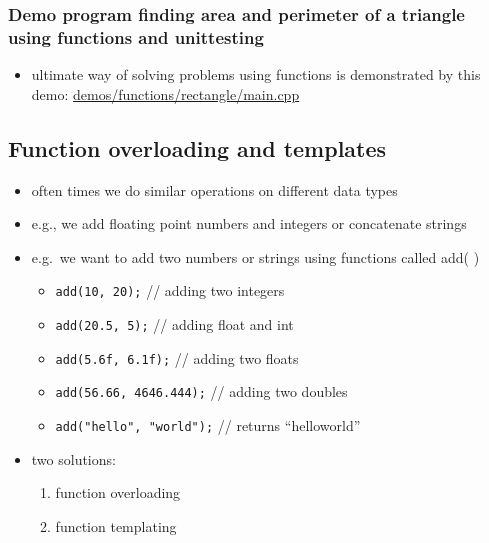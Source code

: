 \documentclass[11pt]{article}
\providecommand{\tightlist}{%
      \setlength{\itemsep}{0pt}\setlength{\parskip}{0pt}}
\begin{document}
\hypertarget{demo-program-finding-area-and-perimeter-of-a-triangle-using-functions-and-unittesting}{%
\subsubsection{Demo program finding area and perimeter of a triangle
using functions and
unittesting}\label{demo-program-finding-area-and-perimeter-of-a-triangle-using-functions-and-unittesting}}

\begin{itemize}
\tightlist
\item
  ultimate way of solving problems using functions is demonstrated by
  this demo: \url{demos/functions/rectangle/main.cpp}
\end{itemize}

    \hypertarget{function-overloading-and-templates}{%
\subsection{Function overloading and
templates}\label{function-overloading-and-templates}}

\begin{itemize}
\tightlist
\item
  often times we do similar operations on different data types
\item
  e.g., we add floating point numbers and integers or concatenate
  strings
\item
  e.g.~we want to add two numbers or strings using functions called add(
  )

  \begin{itemize}
  \tightlist
  \item
    \texttt{add(10,\ 20);} // adding two integers
  \item
    \texttt{add(20.5,\ 5);} // adding float and int
  \item
    \texttt{add(5.6f,\ 6.1f);} // adding two floats
  \item
    \texttt{add(56.66,\ 4646.444);} // adding two doubles
  \item
    \texttt{add("hello",\ "world");} // returns ``helloworld''
  \end{itemize}
\item
  two solutions:

  \begin{enumerate}
  \def\labelenumi{\arabic{enumi}.}
  \tightlist
  \item
    function overloading
  \item
    function templating
  \end{enumerate}
\end{itemize}
\end{document}
